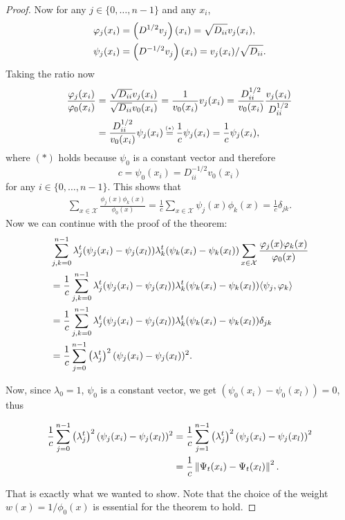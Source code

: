 \begin{proof}
    Now for any $j\in\{0,\dots,n-1\}$ and any $x_i$,
        \begin{align*}
            & \varphi_j(x_i) = \left( D^{1/2}v_j\right)(x_i) =  \sqrt{D_{ii}}v_j(x_i),\\
            & \psi_j(x_i) = \left( D^{-1/2}v_j\right)(x_i) = v_j(x_i) / \sqrt{D_{ii}}.
        \end{align*}
        Taking the ratio now
        \begin{align*}
            \frac{\phi_j(x_i)}{\phi_0(x_i)} & = \frac{\sqrt{D_{ii}}v_j(x_i)}{\sqrt{D_{ii}}v_0(x_i)} = \frac{1}{v_0(x_i)}v_j(x_i) = \frac{D_{ii}^{1/2}}{v_0(x_i)}\frac{v_j(x_i)}{D_{ii}^{1/2}} \\
            & = \frac{D_{ii}^{1/2}}{v_0(x_i)}\psi_j(x_i) \trn \frac{1}{c}\psi_j(x_i) =\frac{1}{c} \psi_j(x_i),
        \end{align*}
        where $(\ast)$ holds because $\psi_0$ is a constant vector and therefore $$c=\psi_0(x_i)=D_{ii}^{-1/2}v_0(x_i)$$ 
        for any $i\in\{0,\dots, n-1\}$. This shows that
        \begin{gather*}
            \sum\limits_{x\in \mathcal{X}}\frac{\phi_j(x)\phi_k(x)}{\phi_0(x)}=\frac{1}{c}\sum\limits_{x\in\mathcal{X}}\psi_j(x)\phi_k(x)=\frac{1}{c}\delta_{jk}.
        \end{gather*}
        Now we can continue with the proof of the theorem:
    \begin{align*}
        & \sum_{j,k=0}^{n-1} \lambda_j^t(\psi_j(x_i)-\psi_j(x_l))\lambda_k^t(\psi_k(x_i)-\psi_k(x_l))\sum_{x\in \mathcal{X}}\frac{\varphi_j(x)\varphi_k(x)}{\varphi_0(x)} \\
        & = \frac{1}{c}\sum_{j,k=0}^{n-1} \lambda_j^t(\psi_j(x_i)-\psi_j(x_l))\lambda_k^t(\psi_k(x_i)-\psi_k(x_l))\langle \psi_j, \varphi_k \rangle \\
        & = \frac{1}{c}\sum_{j,k=0}^{n-1}\lambda_j^t(\psi_j(x_i)-\psi_j(x_l))\lambda_k^t(\psi_k(x_i)-\psi_k(x_l))\delta_{jk} \\
        & = \frac{1}{c}\sum_{j=0}^{n-1}\left(\lambda_j^{t}\right)^2(\psi_j(x_i)-\psi_j(x_l))^2.
    \end{align*}

    Now, since $\lambda_0 = 1$, $\psi_0$ is a constant vector, we get $(\psi_0(x_i)-\psi_0(x_l))=0$, thus
    
    \begin{align*}
        \frac{1}{c}\sum_{j=0}^{n-1}\left(\lambda_j^{t}\right)^2(\psi_j(x_i)-\psi_j(x_l))^2 & = \frac{1}{c} \sum_{j=1}^{n-1}\left(\lambda_j^{t}\right)^2\left(\psi_j(x_i)-\psi_j(x_l)\right)^2 \\
        & = \frac{1}{c}\left\lVert\Psi_t(x_i)-\Psi_t(x_l)\right\rVert^2.
    \end{align*}

    That is exactly what we wanted to show. Note that the choice of the weight $w(x)=1/\phi_0(x)$ is essential for the theorem to hold.
\end{proof}